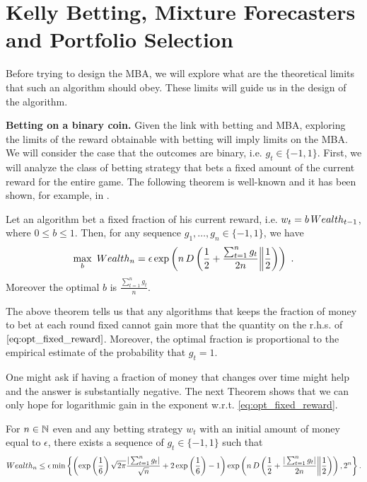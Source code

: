 \section{Kelly Betting, Mixture Forecasters and Portfolio Selection}
\label{sec:kelly}

Before trying to design the \ac{MBA}, we will explore what are the theoretical limits that such an algorithm should obey. These limits will guide us in the design of the algorithm.

\textbf{Betting on a binary coin.}
Given the link with betting and \ac{MBA}, exploring the limits of the reward obtainable with betting will imply limits on the \ac{MBA}.
We will consider the case that the outcomes are binary, i.e. $g_t \in \{-1,1\}$.
First, we will analyze the class of betting strategy that bets a fixed amount of the current reward for the entire game.
The following theorem is well-known and it has been shown, for example, in \cite{McMahanA13}.

\begin{theorem}
\label{thm:oracle_fraction}
Let an algorithm bet a fixed fraction of his current reward, i.e. $w_t=b \, Wealth_{t-1}$, where $0\leq b \leq1$. Then, for any sequence $g_1, \ldots, g_n \in \{-1,1\}$, we have
\begin{equation}
\label{eq:opt_fixed_reward}
\max_{b} \ Wealth_{n}
= \epsilon \exp\left(n\, D\left(\frac{1}{2}+\frac{\sum_{t=1}^n g_t}{2 n}\middle\|\frac{1}{2}\right)\right)~. 
\end{equation}
Moreover the optimal $b$ is $\frac{\sum_{t=1}^n g_t}{n}$.
\end{theorem}

The above theorem tells us that any algorithms that keeps the fraction of money to bet at each round fixed cannot gain more that the quantity on the r.h.s. of $\eqref{eq:opt_fixed_reward}$. Moreover, the optimal fraction is proportional to the empirical estimate of the probability that $g_t=1$.

One might ask if having a fraction of money that changes over time might help and the answer is substantially negative. The next Theorem shows that we can only hope for logarithmic gain in the exponent w.r.t. \eqref{eq:opt_fixed_reward}.
\begin{theorem}
\label{thm:oracle_fraction_changing}
For $n \in \mathbb{N}$ even and any betting strategy $w_t$ with an initial amount of money equal to $\epsilon$, there exists a sequence of $g_t\in\{-1,1\}$ such that
\[
Wealth_{n}
\leq \epsilon \min\left\{\left(\exp\left(\frac{1}{6}\right)\sqrt{2 \pi}\frac{|\sum_{t=1}^n g_t|}{\sqrt{n}} +2\exp\left(\frac{1}{6}\right)-1\right) \exp\left(n\, D\left(\frac{1}{2}+\frac{|\sum_{t=1}^n g_t|}{2 n}\middle\|\frac{1}{2}\right)\right), 2^n\right\}.
\]
\end{theorem}

